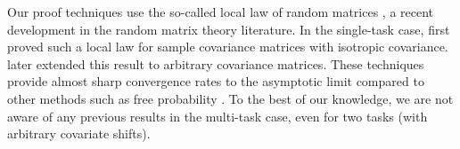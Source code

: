 Our proof techniques use the so-called local law of random matrices \cite{erdos2017dynamical}, a recent development in the random matrix theory literature.
In the single-task case, \cite{isotropic} first proved such a local law for sample covariance matrices with isotropic covariance.
\cite{Anisotropic} later extended this result to arbitrary covariance matrices.
These techniques provide almost sharp convergence rates to the asymptotic limit compared to other methods such as free probability \cite{nica2006lectures}.
To the best of our knowledge, we are not aware of any previous results in the multi-task case, even for two tasks (with arbitrary covariate shifts).









